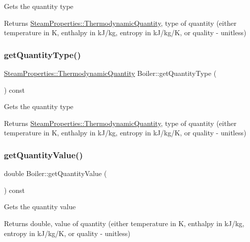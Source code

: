 Gets the quantity type \begin{DoxyReturn}{Returns}
\hyperlink{class_steam_properties_ae0294bedf7d178c2d8fb6aed0f62fbff}{Steam\+Properties\+::\+Thermodynamic\+Quantity}, type of quantity (either temperature in K, enthalpy in k\+J/kg, entropy in k\+J/kg/K, or quality -\/ unitless) 
\end{DoxyReturn}
\mbox{\label{class_boiler_a26a71f789c9f9e05bd43a1ca0219f920}} 
\subsubsection{\texorpdfstring{get\+Quantity\+Type()}{getQuantityType()}\hspace{0.1cm}{\footnotesize\ttfamily [3/3]}}
{\footnotesize\ttfamily \hyperlink{class_steam_properties_ae0294bedf7d178c2d8fb6aed0f62fbff}{Steam\+Properties\+::\+Thermodynamic\+Quantity} Boiler\+::get\+Quantity\+Type (\begin{DoxyParamCaption}{ }\end{DoxyParamCaption}) const}

Gets the quantity type \begin{DoxyReturn}{Returns}
\hyperlink{class_steam_properties_ae0294bedf7d178c2d8fb6aed0f62fbff}{Steam\+Properties\+::\+Thermodynamic\+Quantity}, type of quantity (either temperature in K, enthalpy in k\+J/kg, entropy in k\+J/kg/K, or quality -\/ unitless) 
\end{DoxyReturn}
\mbox{\label{class_boiler_a78370a174135e6cc95abcd3b7ac2f947}} 
\subsubsection{\texorpdfstring{get\+Quantity\+Value()}{getQuantityValue()}\hspace{0.1cm}{\footnotesize\ttfamily [1/3]}}
{\footnotesize\ttfamily double Boiler\+::get\+Quantity\+Value (\begin{DoxyParamCaption}{ }\end{DoxyParamCaption}) const}

Gets the quantity value \begin{DoxyReturn}{Returns}
double, value of quantity (either temperature in K, enthalpy in k\+J/kg, entropy in k\+J/kg/K, or quality -\/ unitless) 
\end{DoxyReturn}


